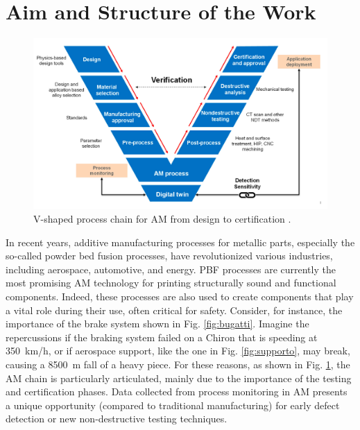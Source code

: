\section{Aim and Structure of the Work}
\label{sec:aimwork}
\begin{figure}
    \centering
    \includegraphics[width=0.7 \textwidth]{Images/lagrandevulva.png}
    \caption[AM process chain.]{V-shaped process chain for AM from design to certification \cite{moshiri_performance_2023}.}
    \label{fig:vchain}
\end{figure}
In recent years, additive manufacturing processes for metallic parts, especially the so-called powder bed fusion processes, have revolutionized various industries, including aerospace, automotive, and energy. PBF processes are currently the most promising AM technology for printing structurally sound and functional components. Indeed, these processes are also used to create components that play a vital role during their use, often critical for safety. Consider, for instance, the importance of the brake system shown in Fig. \ref{fig:bugatti}. Imagine the repercussions if the braking system failed on a Chiron that is speeding at \SI{350}{\kilo\metre /\hour}, or if aerospace support, like the one in Fig. \ref{fig:supporto}, may break, causing a \SI{8500}{\metre} fall of a heavy piece. For these reasons, as shown in Fig. \ref{fig:vchain}, the AM chain is particularly articulated, mainly due to the importance of the testing and certification phases. Data collected from process monitoring in AM presents a unique opportunity (compared to traditional manufacturing) for early defect detection or new non-destructive testing techniques.
